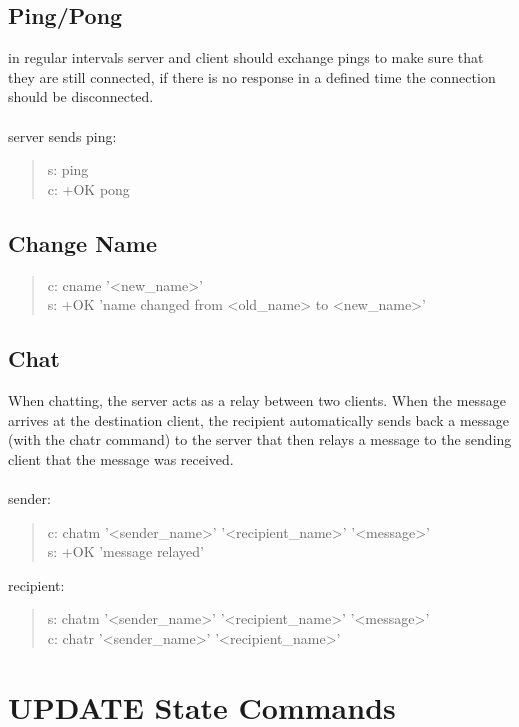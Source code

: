 \documentclass[a4paper,11pt]{article}
\begin{document}
\subsection{Ping/Pong}
in regular intervals server and client should exchange pings to make sure that they are still connected, if there is no response in a defined time the connection should be disconnected.\\\\
\noindent
server sends ping:
\begin{quote}
  s: ping\\
  c: +OK pong
\end{quote}


\subsection{Change Name}

\begin{quote}
  c: cname '<new\_name>'\\
  s: +OK 'name changed from <old\_name> to <new\_name>'
\end{quote}


\subsection{Chat}
When chatting, the server acts as a relay between two clients. When the message arrives at the destination client, the recipient automatically sends back a message (with the chatr command) to the server that then relays a message to the sending client that the message was received.\\\\
sender:
\begin{quote}
  c: chatm '<sender\_name>' '<recipient\_name>' '<message>'\\ %
  s: +OK 'message relayed'
\end{quote}
\noindent
recipient:
\begin{quote}
    s: chatm '<sender\_name>' '<recipient\_name>' '<message>'\\
  c: chatr '<sender\_name>' '<recipient\_name>'%
\end{quote}
\clearpage
\section{UPDATE State Commands}
\end{document}
